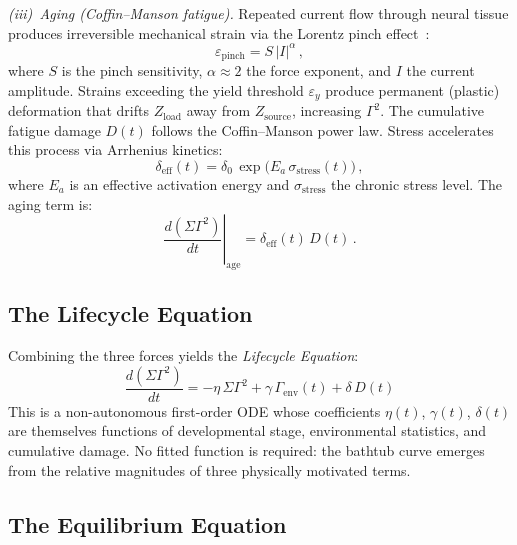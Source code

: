 ﻿\documentclass[aps,pre,twocolumn,superscriptaddress,floatfix]{revtex4-2}
\begin{document}
\emph{(iii)~Aging (Coffin--Manson fatigue).}
Repeated current flow through neural tissue produces
irreversible mechanical strain via the Lorentz
pinch effect~\cite{Coffin1954}:
\begin{equation}
  \varepsilon_{\mathrm{pinch}} = S\,|I|^\alpha\,,
  \label{eq:pinch}
\end{equation}
where $S$ is the pinch sensitivity, $\alpha \approx 2$
the force exponent, and $I$ the current amplitude.
Strains exceeding the yield threshold $\varepsilon_y$
produce permanent (plastic) deformation that drifts
$Z_{\mathrm{load}}$ away from $Z_{\mathrm{source}}$,
increasing $\Gamma^2$.
The cumulative fatigue damage $D(t)$ follows the
Coffin--Manson power law.
Stress accelerates this process via Arrhenius kinetics:
\begin{equation}
  \delta_{\mathrm{eff}}(t) = \delta_0\,
    \exp\!\bigl(E_a\,\sigma_{\mathrm{stress}}(t)\bigr)\,,
  \label{eq:arrhenius-aging}
\end{equation}
where $E_a$ is an effective activation energy and
$\sigma_{\mathrm{stress}}$ the chronic stress level.
The aging term is:
\begin{equation}
  \left.\frac{d(\Sigma\Gamma^2)}{dt}\right|_{\mathrm{age}}
    = \delta_{\mathrm{eff}}(t)\,D(t)\,.
  \label{eq:aging-term}
\end{equation}


\subsection{The Lifecycle Equation}
\label{sec:lifecycle-eq}

Combining the three forces yields the
\emph{Lifecycle Equation}:
\begin{equation}
  \boxed{\;
  \frac{d(\Sigma\Gamma^2)}{dt}
    = -\eta\,\Sigma\Gamma^2
    + \gamma\,\Gamma_{\mathrm{env}}(t)
    + \delta\,D(t)
  \;}
  \label{eq:lifecycle}
\end{equation}
This is a non-autonomous first-order ODE whose
coefficients $\eta(t)$, $\gamma(t)$, $\delta(t)$
are themselves functions of developmental stage,
environmental statistics, and cumulative damage.
No fitted function is required: the bathtub curve
emerges from the relative magnitudes of three
physically motivated terms.


\subsection{The Equilibrium Equation}
\label{sec:equilibrium}
\end{document}
